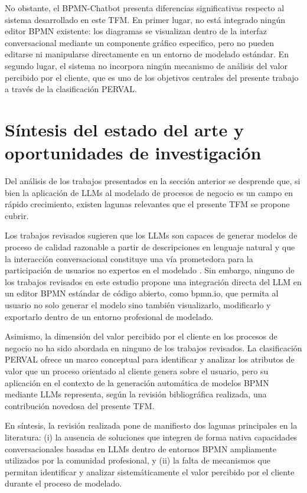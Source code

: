 No obstante, el BPMN-Chatbot presenta diferencias significativas respecto al sistema desarrollado en este TFM. En primer lugar, no está integrado 
 ningún editor BPMN existente: los diagramas se visualizan dentro de la interfaz conversacional mediante un componente gráfico especifico, 
 pero no pueden editarse ni manipularse directamente en un entorno de modelado estándar. En segundo lugar, el sistema no incorpora ningún 
 mecanismo de análisis del valor percibido por el cliente, que es uno de los objetivos centrales del presente trabajo a través de la 
 clasificación PERVAL.

\section{Síntesis del estado del arte y oportunidades de investigación}

Del análisis de los trabajos presentados en la sección anterior se desprende que, si bien la aplicación de LLMs al modelado de procesos de negocio 
es un campo en rápido crecimiento, existen lagunas relevantes que el presente TFM se propone cubrir.

Los trabajos revisados sugieren que los LLMs son capaces de generar modelos de proceso de calidad razonable a partir de descripciones en lenguaje natural
\cite{klievtsova2023,bise2025bpmn} y que la interacción conversacional constituye una vía prometedora para la participación
de usuarios no expertos en el modelado \cite{abb2023,fillies2024}. Sin embargo, ninguno de los trabajos revisados en este estudio propone una integración
directa del LLM en un editor BPMN estándar de código abierto, como bpmn.io, que permita al usuario no solo generar el modelo sino también
visualizarlo, modificarlo y exportarlo dentro de un entorno profesional de modelado.

Asimismo, la dimensión del valor percibido por el cliente en los procesos de negocio no ha sido abordada en ninguno de los trabajos revisados. La 
clasificación PERVAL ofrece un marco conceptual para identificar y analizar los atributos de valor que un proceso orientado al cliente genera 
sobre el usuario, pero su aplicación en el contexto de la generación automática de modelos BPMN mediante LLMs representa, según la revisión bibliográfica realizada, una contribución novedosa del
presente TFM.

En síntesis, la revisión realizada pone de manifiesto dos lagunas principales en la literatura: (i) la ausencia de soluciones que integren de forma nativa capacidades conversacionales basadas en LLMs dentro de entornos BPMN ampliamente utilizados por la comunidad profesional, y (ii) la falta de mecanismos que permitan identificar y analizar sistemáticamente el valor percibido por el cliente durante el proceso de modelado.

